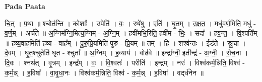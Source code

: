 \documentclass[17pt]{extarticle}
\begin{document}
\textbf{Pada Paata} \newline

चि॒त् । प॒था ॥ श्चोत॑न्ति । कोशाः᳚ । उपेति॑ । वः॒ । रथे॑षु । एति॑ । घृ॒तम् । उ॒क्ष॒त॒ । मधु॑वर्ण॒मिति॒ मधु॑ - व॒र्ण॒म् । अर्च॑ते ॥ अ॒ग्निम॑ग्नि॒मित्य॒ग्निम् - अ॒ग्नि॒म् । हवी॑मभि॒रिति॒ हवी॑म - भिः॒ । सदा᳚ । ह॒व॒न्त॒ । वि॒श्पति᳚म् ॥ ह॒व्य॒वाह॒मिति॑ हव्य - वाह᳚म् । पु॒रु॒प्रि॒यमिति॑ पुरु - प्रि॒यम् ॥ तम् । हि । शश्व॑न्तः । ईड॑ते । स्रु॒चा । दे॒वम् । घृ॒त॒श्चुतेति॑ घृत - श्चुता᳚ ॥ अ॒ग्निम् । ह॒व्याय॑ । वोढ॑वे ॥ इन्द्रा᳚ग्नी॒ इतीन्द्र॑ - अ॒ग्नी॒ । रो॒च॒ना । दि॒वः । श्नथ॑त् । वृ॒त्रम् । इन्द्र᳚म् । वः॒ । वि॒श्वतः॑ । परीति॑ । इन्द्र᳚म् । नरः॑ । विश्व॑कर्म॒न्निति॒ विश्व॑ - क॒र्म॒न्न् । ह॒विषा᳚ । वा॒वृ॒धा॒नः । विश्व॑कर्म॒न्निति॒ विश्व॑ - क॒र्म॒न्न् । ह॒विषा᳚ । वद्‌र्ध॑नेन ॥  \newline
\end{document}
